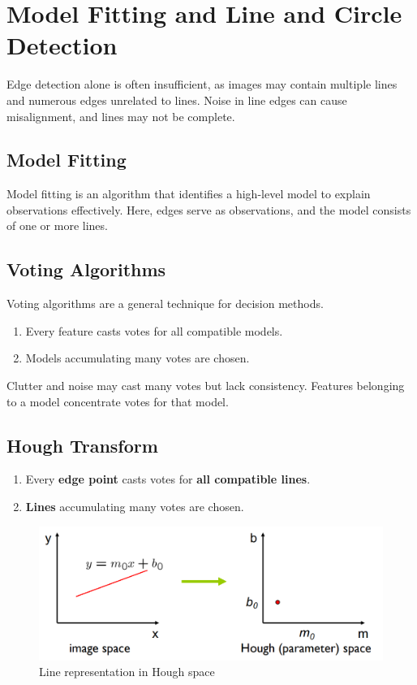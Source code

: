 \section{Model Fitting and Line and Circle Detection}

Edge detection alone is often insufficient, as images may contain multiple lines and numerous edges unrelated to lines.
Noise in line edges can cause misalignment, and lines may not be complete.

\subsection{Model Fitting}

Model fitting is an algorithm that identifies a high-level model to explain observations effectively.
Here, edges serve as observations, and the model consists of one or more lines.

\subsection{Voting Algorithms}

Voting algorithms are a general technique for decision methods.

\begin{enumerate}
	\item Every feature casts votes for all compatible models.
	\item Models accumulating many votes are chosen.
\end{enumerate}

Clutter and noise may cast many votes but lack consistency. Features belonging to a model concentrate votes for that model.

\subsection{Hough Transform}

\begin{enumerate}
	\item Every \textbf{edge point} casts votes for \textbf{all compatible lines}.
	\item \textbf{Lines} accumulating many votes are chosen.
\end{enumerate}

\begin{figure}[H]
	\centering
	\includegraphics[width=0.7\linewidth,keepaspectratio]{img/line_representation_hough}
	\caption{Line representation in Hough space}
\end{figure}

